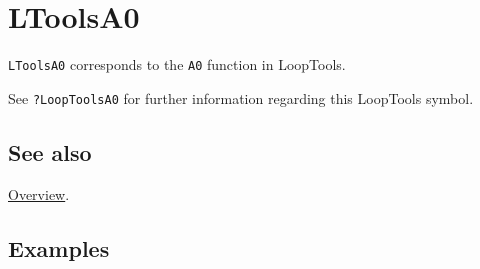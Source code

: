 \documentclass[../FeynHelpersManual.tex]{subfiles}
\begin{document}
\hypertarget{ltoolsa0}{
\section{LToolsA0}\label{ltoolsa0}}

\texttt{LToolsA0} corresponds to the \texttt{A0} function in LoopTools.

See \texttt{?LoopTools\textasciigrave A0} for further information
regarding this LoopTools symbol.

\subsection{See also}

\hyperlink{toc}{Overview}.

\subsection{Examples}
\end{document}
